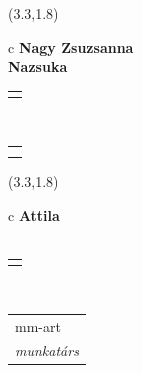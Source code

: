 \documentclass[11pt]{article}
\begin{document}
\makebox(3.3,1.8){
  \renewcommand\arraystretch{1.3}
  \begin{tabular}[c]{c}
    \hspace{8.5mm}
    \LARGE\bf{ Nagy Zsuzsanna }\\
    \hspace{8.5mm}
    \Large{ Nazsuka }\\
    \renewcommand\arraystretch{3}
    \begin{tabular}[c]{c}
      \centering
      \fontfamily{phv}\selectfont{
        \textbf{
          \textsc{
            \scriptsize{
            \color{Dark}{ Ismerkedő }\color{Bright}{ Webmester }\color{Bright}{ Sminkmester }\color{Bright}{ Programozó }
            }
          }
        }
      }
    \end{tabular}
    \\
    \renewcommand\arraystretch{1}
    \begin{tabular}{p{3.3in}}
      \hspace{.7cm}\\
      \hspace{.7cm}\emph{  }\\
    \end{tabular}
  \end{tabular}
}

\makebox(3.3,1.8){
  \renewcommand\arraystretch{1.3}
  \begin{tabular}[c]{c}
    \hspace{8.5mm}
    \LARGE\bf{ Attila }\\
    \hspace{8.5mm}
    \Large{  }\\
    \renewcommand\arraystretch{3}
    \begin{tabular}[c]{c}
      \centering
      \fontfamily{phv}\selectfont{
        \textbf{
          \textsc{
            \scriptsize{
            \color{Dark}{ Ismerkedő }\color{Bright}{ Webmester }\color{Bright}{ Sminkmester }\color{Bright}{ Programozó }
            }
          }
        }
      }
    \end{tabular}
    \\
    \renewcommand\arraystretch{1}
    \begin{tabular}{p{3.3in}}
      \hspace{.7cm}mm-art\\
      \hspace{.7cm}\emph{ munkatárs }\\
    \end{tabular}
  \end{tabular}
}
\end{document}
